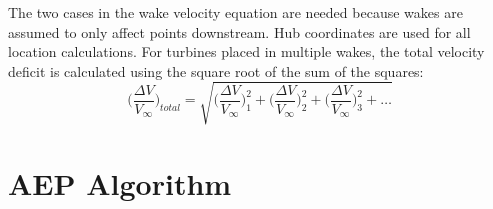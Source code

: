 \documentclass[10pt]{article}
\begin{document}
    The two cases in the wake velocity equation are needed because wakes are assumed to only affect points downstream.
    Hub coordinates are used for all location calculations. For turbines placed in multiple wakes, the total velocity deficit is calculated using the square root of the sum of the squares:
    \begin{equation}
    \label{Eq:CmbndWake}
        \bigg(\frac{\Delta V}{V_{\infty}}\bigg)_{total} = 
            \sqrt{
                \bigg(\frac{\Delta V}{V_{\infty}}\bigg)_{1}^{2} +
                \bigg(\frac{\Delta V}{V_{\infty}}\bigg)_{2}^{2} +
                \bigg(\frac{\Delta V}{V_{\infty}}\bigg)_{3}^{2} +
                \dots}
    \end{equation}

\section*{AEP Algorithm}
    
\end{document}
